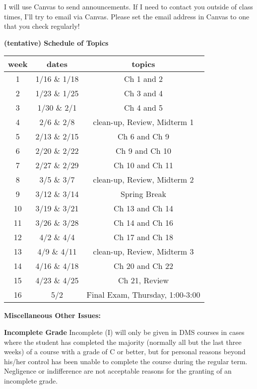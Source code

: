 \documentclass[12pt]{article}
\begin{document}
I will use Canvas to send announcements.  If I need to contact you outside of class times, I'll try to email via Canvas.  Please set the email address in Canvas to one that you check regularly!



\begin{center}
\textbf{(tentative) Schedule of Topics}\\

\begin{tabular}{c | c || c}
week & dates &topics \\
\hline \hline
1& 1/16 \& 1/18 &Ch 1 and 2\\ \hline
2& 1/23 \& 1/25& Ch 3 and 4\\ \hline
3& 1/30 \& 2/1 & Ch 4 and 5\\ \hline
4& 2/6 \& 2/8 & clean-up, Review, Midterm 1\\ \hline
5& 2/13 \& 2/15& Ch 6 and Ch 9 \\ \hline
6& 2/20 \& 2/22& Ch 9 and Ch 10 \\ \hline
7& 2/27 \& 2/29& Ch 10 and Ch 11 \\ \hline
8& 3/5 \& 3/7& clean-up, Review, Midterm 2\\ \hline
9& 3/12 \& 3/14 &Spring Break\\ \hline
10& 3/19 \& 3/21& Ch 13 and Ch 14  \\ \hline
11& 3/26 \& 3/28& Ch 14 and Ch 16 \\ \hline
12& 4/2 \& 4/4& Ch 17 and Ch 18\\ \hline
13& 4/9 \& 4/11&clean-up, Review, Midterm 3\\ \hline
14& 4/16 \& 4/18&Ch 20 and Ch 22\\ \hline
15& 4/23 \& 4/25&Ch 21, Review\\ \hline
16& 5/2& Final Exam, Thursday, 1:00-3:00\\ 
\end{tabular}
\end{center}

\newpage


\textbf{Miscellaneous Other Issues:}

\textbf{Incomplete Grade} 
Incomplete (I) will only be given in DMS courses in cases where the student has completed the majority (normally all but the last three weeks) of a course with a grade of C or better, but for personal reasons beyond his/her control has been unable to complete the course during the regular term. Negligence or indifference are not acceptable reasons for the granting of an incomplete grade. 
\end{document}
